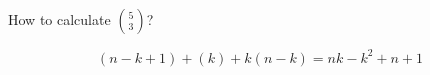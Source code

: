 \begin{frame}{}

  \pause
  \centerline{\large {} How to calculate $\binom{5}{3}$?}
\end{frame}

\begin{frame}{}
  

  \pause
  \[
    (n-k+1) + (k) + k (n-k) = nk - k^2 + n + 1
  \]
\end{frame}
